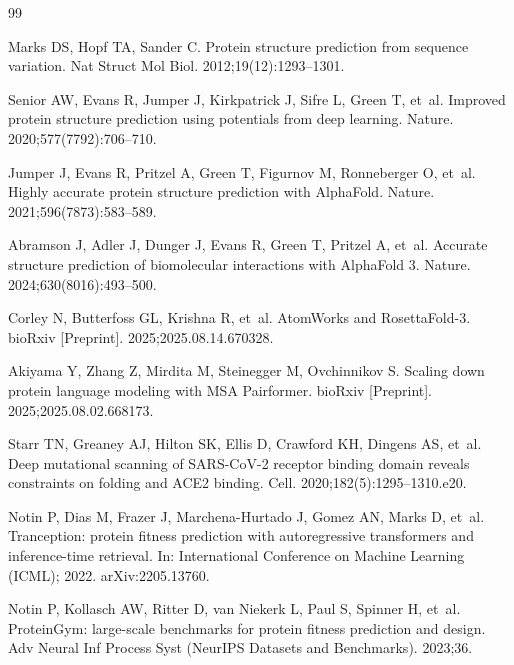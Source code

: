 \documentclass[10pt,a4paper]{article}
\begin{document}
\begin{thebibliography}{99}

Marks DS, Hopf TA, Sander C.
\newblock Protein structure prediction from sequence variation.
\newblock Nat Struct Mol Biol. 2012;19(12):1293--1301.

Senior AW, Evans R, Jumper J, Kirkpatrick J, Sifre L, Green T, et~al.
\newblock Improved protein structure prediction using potentials from deep learning.
\newblock Nature. 2020;577(7792):706--710.

Jumper J, Evans R, Pritzel A, Green T, Figurnov M, Ronneberger O, et~al.
\newblock Highly accurate protein structure prediction with AlphaFold.
\newblock Nature. 2021;596(7873):583--589.

Abramson J, Adler J, Dunger J, Evans R, Green T, Pritzel A, et~al.
\newblock Accurate structure prediction of biomolecular interactions with AlphaFold 3.
\newblock Nature. 2024;630(8016):493--500.

Corley N, Butterfoss GL, Krishna R, et~al.
\newblock AtomWorks and RosettaFold-3.
\newblock bioRxiv [Preprint]. 2025;2025.08.14.670328.

Akiyama Y, Zhang Z, Mirdita M, Steinegger M, Ovchinnikov S.
\newblock Scaling down protein language modeling with MSA Pairformer.
\newblock bioRxiv [Preprint]. 2025;2025.08.02.668173.

Starr TN, Greaney AJ, Hilton SK, Ellis D, Crawford KH, Dingens AS, et~al.
\newblock Deep mutational scanning of SARS-CoV-2 receptor binding domain reveals constraints on folding and ACE2 binding.
\newblock Cell. 2020;182(5):1295--1310.e20.

Notin P, Dias M, Frazer J, Marchena-Hurtado J, Gomez AN, Marks D, et~al.
\newblock Tranception: protein fitness prediction with autoregressive transformers and inference-time retrieval.
\newblock In: International Conference on Machine Learning (ICML); 2022. arXiv:2205.13760.

Notin P, Kollasch AW, Ritter D, van Niekerk L, Paul S, Spinner H, et~al.
\newblock ProteinGym: large-scale benchmarks for protein fitness prediction and design.
\newblock Adv Neural Inf Process Syst (NeurIPS Datasets and Benchmarks). 2023;36.


\end{thebibliography}
\end{document}
